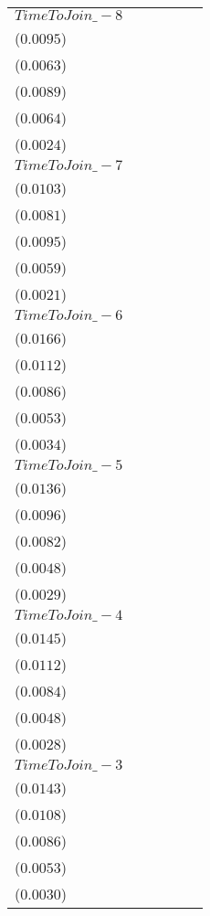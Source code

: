 \begin{tabular}{llllll}
$TimeToJoin\_-8$  &     \makecell{$0.0068^{}$ \\ ($0.0095$)} &     \makecell{$0.0041^{}$ \\ ($0.0063$)} &    \makecell{$-0.0172^{*}$ \\ ($0.0089$)} &     \makecell{$-0.0053^{}$ \\ ($0.0064$)} &     \makecell{$0.0033^{}$ \\ ($0.0024$)} \\
$TimeToJoin\_-7$  &    \makecell{$-0.0018^{}$ \\ ($0.0103$)} &    \makecell{$-0.0010^{}$ \\ ($0.0081$)} &    \makecell{$-0.0157^{*}$ \\ ($0.0095$)} &     \makecell{$-0.0057^{}$ \\ ($0.0059$)} &   \makecell{$0.0042^{**}$ \\ ($0.0021$)} \\
$TimeToJoin\_-6$  &    \makecell{$-0.0040^{}$ \\ ($0.0166$)} &    \makecell{$-0.0028^{}$ \\ ($0.0112$)} &   \makecell{$-0.0177^{**}$ \\ ($0.0086$)} &     \makecell{$-0.0082^{}$ \\ ($0.0053$)} &     \makecell{$0.0029^{}$ \\ ($0.0034$)} \\
$TimeToJoin\_-5$  &    \makecell{$-0.0011^{}$ \\ ($0.0136$)} &     \makecell{$0.0013^{}$ \\ ($0.0096$)} &   \makecell{$-0.0205^{**}$ \\ ($0.0082$)} &   \makecell{$-0.0107^{**}$ \\ ($0.0048$)} &     \makecell{$0.0045^{}$ \\ ($0.0029$)} \\
$TimeToJoin\_-4$  &    \makecell{$-0.0020^{}$ \\ ($0.0145$)} &     \makecell{$0.0003^{}$ \\ ($0.0112$)} &   \makecell{$-0.0204^{**}$ \\ ($0.0084$)} &   \makecell{$-0.0110^{**}$ \\ ($0.0048$)} &   \makecell{$0.0057^{**}$ \\ ($0.0028$)} \\
$TimeToJoin\_-3$  &     \makecell{$0.0039^{}$ \\ ($0.0143$)} &     \makecell{$0.0038^{}$ \\ ($0.0108$)} &   \makecell{$-0.0204^{**}$ \\ ($0.0086$)} &    \makecell{$-0.0097^{*}$ \\ ($0.0053$)} &   \makecell{$0.0066^{**}$ \\ ($0.0030$)} \\

\end{tabular}
